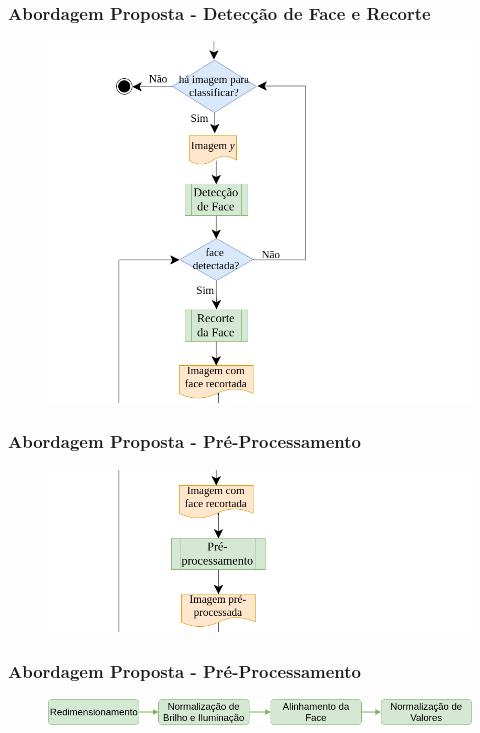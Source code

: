 \documentclass{beamer}
\begin{document}
\begin{frame}
\frametitle{Abordagem Proposta - Detecção de Face e Recorte}
\begin{figure}
\centering
\includegraphics[scale=0.27]{figuras/arquitetura_2.png}
\label{fig:arquitetura2}
\end{figure}
\end{frame}

\begin{frame}
\frametitle{Abordagem Proposta - Pré-Processamento}
\begin{figure}
\centering
\includegraphics[scale=0.37]{figuras/arquitetura_3.png}
\label{fig:arquitetura3}
\end{figure}
\end{frame}


\begin{frame}
 \frametitle{Abordagem Proposta - Pré-Processamento}

\begin{figure}
\centering
\includegraphics[scale=0.33]{figuras/PreProcessamentoMestrado.png}
\label{fig:preprocessamento}
\end{figure}

 
\end{frame}
\end{document}
